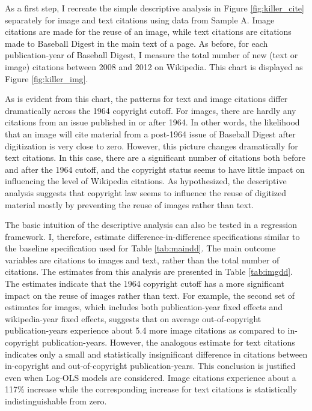 \documentclass[11pt]{article}
\begin{document}
As a first step, I recreate the simple descriptive analysis in Figure \ref{fig:killer_cite} separately for image and text citations using data from Sample A. Image citations are made for the reuse of an image, while text citations are citations made to Baseball Digest in the main text of a page. As before, for each publication-year of Baseball Digest, I measure the total number of new (text or image) citations between 2008 and 2012 on Wikipedia. This chart is displayed as Figure \ref{fig:killer_img}.  

As is evident from this chart, the patterns for text and image citations differ dramatically across the 1964 copyright cutoff. For images, there are hardly any citations from an issue published in or after 1964. In other words, the likelihood that an image will cite material from a post-1964 issue of Baseball Digest after digitization is very close to zero. However, this picture changes dramatically for text citations. In this case, there are a significant number of citations both before and after the 1964 cutoff, and the copyright status seems to have little impact on influencing the level of Wikipedia citations. As hypothesized, the descriptive analysis suggests that copyright law seems to influence the reuse of digitized material mostly by preventing the reuse of images rather than text. 

The basic intuition of the descriptive analysis can also be tested in a regression framework. I, therefore, estimate difference-in-difference specifications similar to the baseline specification used for Table \ref{tab:maindd}. The main outcome variables are citations to images and text, rather than the total number of citations. The estimates from this analysis are presented in Table \ref{tab:imgdd}. The estimates indicate that the 1964 copyright cutoff has a more significant impact on the reuse of images rather than text. For example, the second set of estimates for images, which includes both publication-year fixed effects and wikipedia-year fixed effects, suggests that on average out-of-copyright publication-years experience about 5.4 more image citations as compared to in-copyright publication-years. However, the analogous estimate for text citations indicates only a small and statistically insignificant difference in citations between in-copyright and out-of-copyright publication-years. This conclusion is justified even when Log-OLS models are considered. Image citations experience about a 117\% increase while the corresponding increase for text citations is statistically indistinguishable from zero. 
\end{document}
